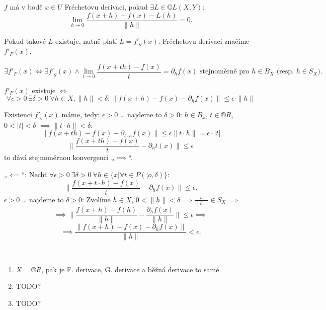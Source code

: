 \documentclass[12pt]{article}					%
\begin{document}
\begin{definice}
	$f$ má v bodě $x \in U$ Fréchetovu derivaci, pokud $\exists L \in ©L(X, Y)$:
	$$ \lim_{h \rightarrow 0} \frac{f(x + h) - f(x) - L(h)}{\|h\|} = 0. $$

	\begin{poznamkain}
		Pokud takové $L$ existuje, nutně platí $L = f'_g(x)$. Fréchetovu derivaci značíme $f'_F(x)$.
	\end{poznamkain}
\end{definice}

\begin{poznamka}
	$$ \exists f'_F(x) \Leftrightarrow \exists f'_g(x) \land \lim_{t \rightarrow 0} \frac{f(x + th) - f(x)}{t} = \partial_h f(x) \text{ stejnoměrně pro $h \in B_X$ (resp. $h \in S_X$)}. $$

	\begin{dukazin}
		$f'_F(x)$ existuje $\Leftrightarrow$
		$$ \forall \epsilon > 0\ \exists \delta > 0\ \forall h \in X, \|h\|< \delta: \|f(x + h) - f(x) - \partial_h f(x)\| ≤ \epsilon·\|h\| $$

		Existenci $f'_g(x)$ máme, tedy: $\epsilon > 0$ … najdeme to $\delta > 0$: $h \in B_x$, $t \in ®R$, $0 < |t| < \delta$ $\implies \|t·h\| < \delta$:
		$$ \|f(x + th) - f(x) - \partial_{t·h} f(x) \|≤ \epsilon \|t·h\| = \epsilon · |t| $$
		$$ \|\frac{f(x + th) - f(x)}{t} - \partial_h t(x)\| ≤ \epsilon $$
		to dává stejnoměrnou konvergenci „$\implies$“.

		„$\impliedby$“: Nechť $\forall \epsilon > 0\ \exists \delta > 0\ \forall h \in \{x | \forall t \in P(¦o, \delta)\}$:
		$$ \| \frac{f(x + t·h) - f(x)}{t} - \partial_h f(x)\| ≤ \epsilon. $$
		$\epsilon > 0$ … najdeme to $\delta > 0$: Zvolíme $h \in X$, $0 < \|h\| < \delta \implies \frac{h}{\|h\|} \in S_X \implies$
		$$ \implies \| \frac{f(x + h) - f(h)}{\|h\|} - \frac{\partial_h f(x)}{\|h\|} \| ≤ \epsilon \implies $$
		$$ \implies \frac{\|f(x + h) - f(x) - \partial_h f(x)\|}{\|h\|} < \epsilon. $$
	\end{dukazin}
\end{poznamka}

\begin{poznamka}
	\ 
	\begin{enumerate}
		\item $X = ®R$, pak je F. derivace, G. derivace a běžná derivace to samé.
		\item TODO?
		\item TODO?
	\end{enumerate}
\end{poznamka}
\end{document}
